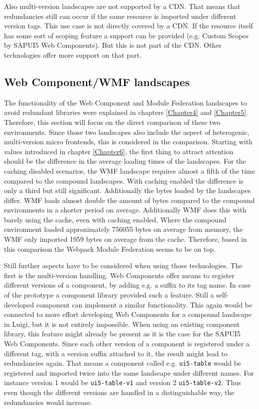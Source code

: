 Also multi-version landscapes are not supported by a CDN. That means that redundancies still can occur if the same resource is imported under different version tags. This use case is not directly covered by a CDN. If the resource itself has some sort of scoping feature a support can be provided (e.g. Custom Scopes by SAPUI5 Web Components). But this is not part of the CDN. Other technologies offer more support on that part.

\subsection{Web Component/WMF landscapes}

The functionality of the Web Component and Module Federation landscapes to avoid redundant libraries were explained in chapters \ref{Chapter4} and \ref{Chapter5}. Therefore, this section will focus on the direct comparison of these two environments. Since those two landscapes also include the aspect of heterogenic, multi-version micro frontends, this is considered in the comparison. 
Starting with values introduced in chapter \ref{Chapter6}, the first thing to attract attention should be the difference in the average loading times of the landscapes. For the caching disabled scenarios, the WMF landscape requires almost a fifth of the time compared to the compound landscapes. With caching enabled the difference is only a third but still significant. Additionally the bytes loaded by the landscapes differ. WMF loads almost double the amount of bytes compared to the compound environments in a shorter period on average. Additionally WMF does this with barely using the cache, even with caching enabled. Where the compound environment loaded approximately 756055 bytes on average from memory, the WMF only imported 1959 bytes on average from the cache. Therefore, based in this comparison the Webpack Module Federation seems to be on top.

Still further aspects have to be considered when using those technologies. The first is the multi-version handling. Web Components offer means to register different versions of a component, by adding e.g. a suffix to its tag name. In case of the prototype a component library provided such a feature. Still a self-developed component can implement a similar functionality. This again would be connected to more effort developing Web Components for a compound landscape in Luigi, but it is not entirely impossible.
When using an existing component library, this feature might already be present as it is the case for the SAPUI5 Web Components. 
Since each other version of a component is registered under a different tag, with a version suffix attached to it, the result might lead to redundancies again. That means a component called e.g. \texttt{ui5-table} would be registered and imported twice into the same landscape under different names. For instance version 1 would be \texttt{ui5-table-v1} and version 2 \texttt{ui5-table-v2}. Thus even though the different versions are handled in a distinguishable way, the redundancies would increase.

